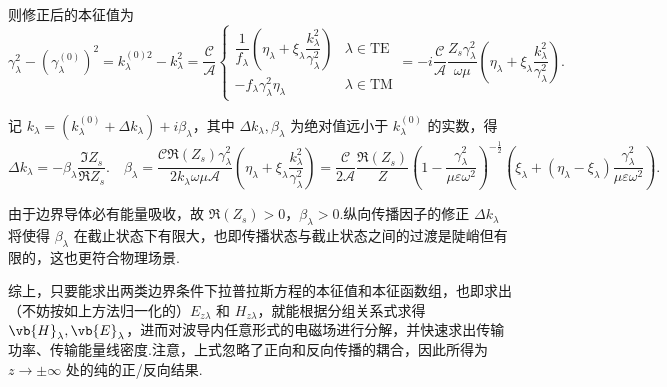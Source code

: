 则修正后的本征值为
\begin{equation*}
	\gamma_{\lambda}^2 - (\gamma_{\lambda}^{(0)})^2 = k_{\lambda}^{(0)2} - k_{\lambda}^2 = \dfrac{\mathcal{C}}{\mathcal{A}} \begin{cases}
		\dfrac{1}{f_{\lambda}} \left( \eta_{\lambda} + \xi_{\lambda} \dfrac{k_{\lambda}^2}{\gamma_{\lambda}^2} \right) & \lambda \in \text{TE} \\
		- f_{\lambda} \gamma_{\lambda}^2 \eta_{\lambda}                                                                & \lambda \in \text{TM}
	\end{cases} = -i \dfrac{\mathcal{C}}{\mathcal{A}} \dfrac{Z_s \gamma_{\lambda}^2}{\omega\mu} \left( \eta_{\lambda} + \xi_{\lambda} \dfrac{k_{\lambda}^2}{\gamma_{\lambda}^2} \right).
\end{equation*}

记 \(k_{\lambda} = (k_{\lambda}^{(0)} + \Delta k_{\lambda}) + i \beta_{\lambda}\)，其中 \(\Delta k_{\lambda}, \beta_{\lambda}\) 为绝对值远小于 \(k_{\lambda}^{(0)}\) 的实数，得
\begin{equation*}
	\Delta k_{\lambda} = -\beta_{\lambda} \frac{\Im Z_s}{\Re Z_s}. \quad \beta_{\lambda} = \dfrac{\mathcal{C}\Re(Z_s)\gamma_{\lambda}^2}{2 k_{\lambda}\omega\mu \mathcal{A}} \left( \eta_{\lambda} + \xi_{\lambda} \dfrac{k_{\lambda}^2}{\gamma_{\lambda}^2} \right) = \dfrac{\mathcal{C}}{2 \mathcal{A}} \dfrac{\Re(Z_s)}{Z} \left( 1 - \dfrac{\gamma_{\lambda}^2}{\mu\varepsilon\omega^2} \right)^{-\frac{1}{2}} \left( \xi_{\lambda} + (\eta_{\lambda} - \xi_{\lambda}) \dfrac{\gamma_{\lambda}^2}{\mu\varepsilon\omega^2} \right).
\end{equation*}

由于边界导体必有能量吸收，故 \(\Re(Z_s) > 0\)，\(\beta_{\lambda} > 0\).纵向传播因子的修正 \(\Delta k_{\lambda}\) 将使得 \(\beta_{\lambda}\) 在截止状态下有限大，也即传播状态与截止状态之间的过渡是陡峭但有限的，这也更符合物理场景.

综上，只要能求出两类边界条件下拉普拉斯方程的本征值和本征函数组，也即求出（不妨按如上方法归一化的）\(E_{z\lambda}\) 和 \(H_{z\lambda}\)，就能根据分组关系式求得 \(\vb{H}_{\lambda}, \vb{E}_{\lambda}\)，进而对波导内任意形式的电磁场进行分解，并快速求出传输功率、传输能量线密度.注意，上式忽略了正向和反向传播的耦合，因此所得为 \(z \to \pm\infty\) 处的纯的正/反向结果.

